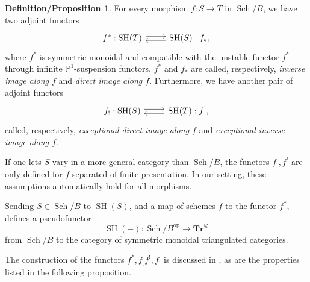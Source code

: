 \documentclass[10pt]{amsart}
\theoremstyle{definition}
\newtheorem{defnprop}[defn]{Definition/Proposition}
\theoremstyle{plain}
\numberwithin{equation}{section}
\newcommand{\0}{\emptyset}
\renewcommand{\P}{{\mathbb P}}
\newcommand{\SH}{{\operatorname{SH}}}
\newcommand{\Sch}{{\operatorname{Sch}}}
\begin{document}
\begin{defnprop}
\label{prop:fourfunctors}
    For every morphism $f:S \to T$ in $\Sch/B$, we have two adjoint functors
    $$
    \begin{tikzcd}
    f^*: \SH(T) \arrow[r, shift left] & \SH(S): f_*, \arrow[l, shift left]
    \end{tikzcd}
    $$
    where $f^*$ is symmetric monoidal and compatible with the unstable functor $f^*$ through infinite $\P^1$-suspension functors. $f^*$ and $f_*$ are called, respectively, \emph{inverse image along $f$} and \emph{direct image along $f$}. Furthermore, we have another pair of adjoint functors
    $$\begin{tikzcd}
    f_!: \SH(S) \arrow[r, shift left] & \SH(T): f^!, \arrow[l, shift left]
    \end{tikzcd}
    $$
    called, respectively, \emph{exceptional direct image along $f$} and \emph{exceptional inverse image along $f$}.
\end{defnprop}

If one lets $S$ vary in a more general category than $\Sch/B$, the functors $f_!,f^!$ are only defined for $f$ separated of finite presentation. In our setting, these assumptions automatically hold for all morphisms.

Sending $S \in \Sch/B$ to $\SH(S)$, and a map of schemes $f$ to the functor $f^*$, defines a pseudofunctor
$$\SH(-): \Sch/B^{\text{op}} \to \mathbf{Tr}^\otimes$$
from $\Sch/B$ to the category of symmetric monoidal triangulated categories. 

The construction of the functors $f^*,f_,f^!,f_!$ is discussed in \cite[Chapter 1]{ayoub:sixfunctors}, as are the properties listed in the following proposition.
\end{document}
